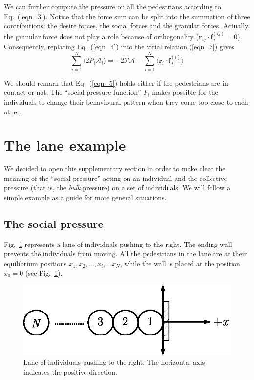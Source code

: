 We can further compute the pressure on all the pedestrians according to  
Eq.~(\ref{eqn_3}). Notice that the force sum can be split into the summation of 
three contributions:  the desire forces, the social forces and the granular 
forces. Actually, the granular force does not play a role because of 
orthogonality ($\mathbf{r}_{ij}\cdot\mathbf{f}_g^{(ij)}=0$). Consequently, 
replacing Eq.~(\ref{eqn_4}) into the virial relation (\ref{eqn_3}) gives \\  



\begin{equation}
 \displaystyle\sum_{i=1}^N\langle2P_i\mathcal{A}_i 
\rangle=-2\mathcal{PA}-\displaystyle\sum_{i=1}^N \langle
\mathbf{r}_i\cdot\mathbf{f}_d^{(i)}\rangle\label{eqn_5}
\end{equation}


We should remark that Eq.~(\ref{eqn_5}) holds either if the pedestrians are in 
contact or not. The ``social pressure function'' $P_i$ makes possible 
for the individuals to change their behavioural pattern when they come too 
close to each other. \\ 

\section{\label{app}The lane example}

We decided to open this supplementary section in order to make clear the 
meaning of the ``social pressure'' acting on an individual and the collective 
pressure (that is, the \textit{bulk} pressure) on a set of individuals. We 
will follow a simple example as a guide for more general situations. \\

\subsection{\label{social_pressure}The social pressure}

Fig.~\ref{fig:18} represents a lane of individuals pushing to the right. The 
ending wall prevents the individuals from moving. All the pedestrians in the 
lane are at their equilibrium positions $x_1,x_2,...,x_{i},...x_N$, 
while the wall is placed at the position $x_0=0$ (see Fig.~\ref{fig:18}).  \\

\begin{figure}[!htbp]
\includegraphics[width=0.75\columnwidth]{./fig15.eps}
\caption{\label{fig:18} Lane of individuals pushing to the right. The 
horizontal axis indicates the positive direction.  }
\end{figure}

